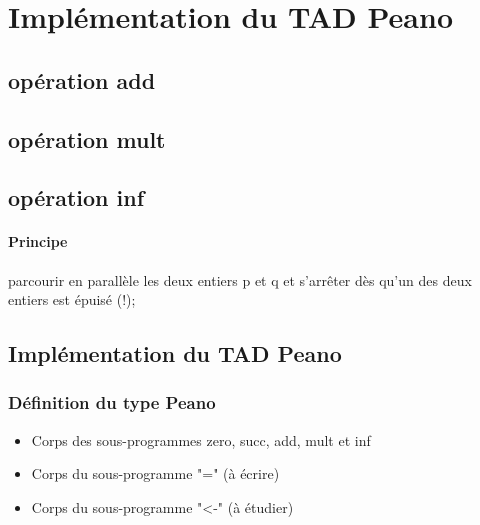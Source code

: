 \documentclass{article}
\begin{document}
		\subsection{}
				
	\section{Implémentation du TAD Peano}
		\subsection{}
				
			\newpage
		\subsection{}
				
		\subsection{opération add}
				
			\newpage
				
		\subsection{opération mult}
				
			\newpage
				
		\subsection{opération inf}
			\paragraph{Principe} parcourir en parallèle les deux entiers p et q et s'arrêter
			dès qu'un des deux entiers est épuisé (!);
		\subsubsection{}	
				
			\newpage
		\subsubsection{}	
				
	\subsection{Implémentation du TAD Peano}		
		\subsubsection{}
		\subsubsection{Définition du type Peano}
		\begin{itemize}
			\item Corps des sous-programmes zero, succ, add, mult et inf
			\item Corps du sous-programme "=" (à écrire)
			\item Corps du sous-programme "<-" (à étudier)
		\end{itemize}	
		
\end{document}
